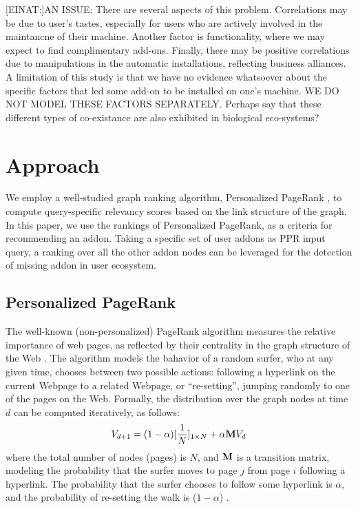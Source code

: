 \documentclass[11pt,oneside]{book}
\let\Oldsection\section
\renewcommand{\section}{\FloatBarrier\Oldsection}
\let\Oldsubsection\subsection
\renewcommand{\subsection}{\FloatBarrier\Oldsubsection}
\newcommand{\transition}{{\bf M}}
\begin{document}
[EINAT:]AN ISSUE: There are several aspects of this problem. Correlations may
be due to user's tastes, especially for users who are actively
involved in the maintancne of their machine. Another factor is
functionality, where we may expect to find complimentary
add-ons. Finally, there may be positive correlations due to
manipulations in the automatic installations, reflecting business
alliances. A limitation of this study is that we have no evidence
whatsoever about the specific factors that led some add-on to be
installed on one's machine. WE DO NOT MODEL THESE FACTORS
SEPARATELY. Perhaps say that these different types of co-existance are
also exhibited in biological eco-systems?

\section{Approach}
\label{sec:method}

We employ a well-studied graph ranking algorithm, Personalized
PageRank \citep{page1999pagerank}, to compute query-specific relevancy
scores based on the link structure of the graph. In this paper, we use
the rankings of Personalized PageRank, as a criteria for recommending
an addon. Taking a specific set of user addons as PPR input query, a
ranking over all the other addon nodes can be leveraged for the
detection of missing addon in user ecosystem.\\

\subsection{Personalized PageRank}
\label{sec:PPR_addons_method}

The well-known (non-personalized) PageRank algorithm measures the
relative importance of web pages, as reflected by their centrality in
the graph structure of the Web \citep{page1999pagerank}. The algorithm
models the bahavior of a random surfer, who at any given time, chooses
between two possible actions: following a hyperlink on the current
Webpage to a related Webpage, or ``re-setting'', jumping randomly to
one of the pages on the Web. Formally, the distribution over the graph
nodes at time $d$ can be computed iteratively, as follows:
\begin{equation}
V_{d+1} = (1-\alpha) [{1 \over N}]_{1 \times N} + \alpha \transition V_d
\label{eq:pagerank}
\end{equation}
where the total number of nodes (pages) is $N$, and $\transition$
is a transition matrix, modeling the probability that the surfer moves
to page $j$ from page $i$ following a hyperlink. The probability that
the surfer chooses to follow some hyperlink is $\alpha$, and the
probability of re-setting the walk is ($1-\alpha$) .
\end{document}
